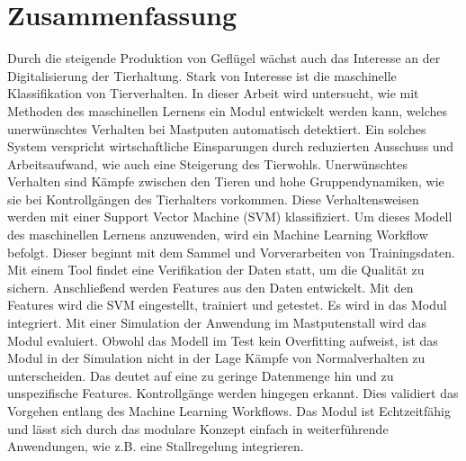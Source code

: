 \section*{Zusammenfassung}

Durch die steigende Produktion von Geflügel wächst auch das Interesse an der Digitalisierung der Tierhaltung. Stark von Interesse ist die maschinelle Klassifikation von Tierverhalten. In dieser Arbeit wird untersucht, wie mit Methoden des maschinellen Lernens ein Modul entwickelt werden kann, welches unerwünschtes Verhalten bei Mastputen automatisch detektiert. Ein solches System verspricht wirtschaftliche Einsparungen durch reduzierten Ausschuss und Arbeitsaufwand, wie auch eine Steigerung des Tierwohls. Unerwünschtes Verhalten sind Kämpfe zwischen den Tieren und hohe Gruppendynamiken, wie sie bei Kontrollgängen des Tierhalters vorkommen. Diese Verhaltensweisen werden mit einer Support Vector Machine (SVM) klassifiziert. Um dieses Modell des maschinellen Lernens anzuwenden, wird ein Machine Learning Workflow befolgt. Dieser beginnt mit dem Sammel und Vorverarbeiten von Trainingsdaten. Mit einem Tool findet eine Verifikation der Daten statt, um die Qualität zu sichern. Anschließend werden Features aus den Daten entwickelt. Mit den Features wird die SVM eingestellt, trainiert und getestet. Es wird in das Modul integriert. Mit einer Simulation der Anwendung im Mastputenstall wird das Modul evaluiert. Obwohl das Modell im Test kein Overfitting aufweist, ist das Modul in der Simulation nicht in der Lage Kämpfe von Normalverhalten zu unterscheiden. Das deutet auf eine zu geringe Datenmenge hin und zu unspezifische Features. Kontrollgänge werden hingegen erkannt. Dies validiert das Vorgehen entlang des Machine Learning Workflows. Das Modul ist Echtzeitfähig und lässt sich durch das modulare Konzept einfach in weiterführende Anwendungen, wie z.B. eine Stallregelung integrieren. 